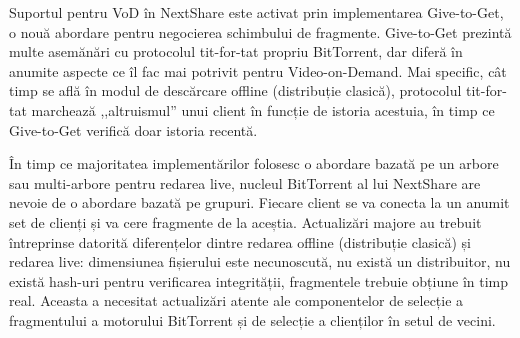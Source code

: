 Suportul pentru VoD în NextShare este activat prin implementarea Give-to-Get,
o nouă abordare pentru negocierea schimbului de fragmente. Give-to-Get prezintă
multe asemănări cu protocolul tit-for-tat propriu BitTorrent, dar diferă în anumite
aspecte ce îl fac mai potrivit pentru Video-on-Demand. Mai specific, cât timp se
află în modul de descărcare offline (distribuție clasică), protocolul tit-for-tat
marchează ,,altruismul'' unui client în funcție de istoria acestuia, în timp ce
Give-to-Get verifică doar istoria recentă.

În timp ce majoritatea implementărilor folosesc o abordare bazată pe un arbore
sau multi-arbore pentru redarea live, nucleul BitTorrent al lui NextShare
are nevoie de o abordare bazată pe grupuri. Fiecare client se va conecta la
un anumit set de clienți și va cere fragmente de la aceștia. Actualizări
majore au trebuit întreprinse datorită diferențelor dintre redarea offline
(distribuție clasică) și redarea live: dimensiunea fișierului este necunoscută,
nu există un distribuitor, nu există hash-uri pentru verificarea integrității,
fragmentele trebuie obțiune în timp real. Aceasta a necesitat actualizări
atente ale componentelor de selecție a fragmentului a motorului BitTorrent și
de selecție a clienților în setul de vecini.

